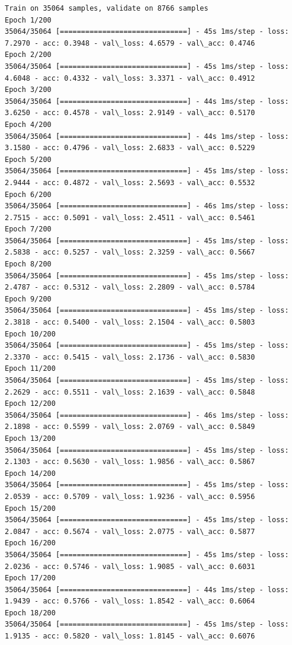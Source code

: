 \documentclass[11pt]{article}
\begin{document}
    \begin{Verbatim}[commandchars=\\\{\}]
Train on 35064 samples, validate on 8766 samples
Epoch 1/200
35064/35064 [==============================] - 45s 1ms/step - loss: 7.2970 - acc: 0.3948 - val\_loss: 4.6579 - val\_acc: 0.4746
Epoch 2/200
35064/35064 [==============================] - 45s 1ms/step - loss: 4.6048 - acc: 0.4332 - val\_loss: 3.3371 - val\_acc: 0.4912
Epoch 3/200
35064/35064 [==============================] - 44s 1ms/step - loss: 3.6250 - acc: 0.4578 - val\_loss: 2.9149 - val\_acc: 0.5170
Epoch 4/200
35064/35064 [==============================] - 44s 1ms/step - loss: 3.1580 - acc: 0.4796 - val\_loss: 2.6833 - val\_acc: 0.5229
Epoch 5/200
35064/35064 [==============================] - 45s 1ms/step - loss: 2.9444 - acc: 0.4872 - val\_loss: 2.5693 - val\_acc: 0.5532
Epoch 6/200
35064/35064 [==============================] - 46s 1ms/step - loss: 2.7515 - acc: 0.5091 - val\_loss: 2.4511 - val\_acc: 0.5461
Epoch 7/200
35064/35064 [==============================] - 45s 1ms/step - loss: 2.5838 - acc: 0.5257 - val\_loss: 2.3259 - val\_acc: 0.5667
Epoch 8/200
35064/35064 [==============================] - 45s 1ms/step - loss: 2.4787 - acc: 0.5312 - val\_loss: 2.2809 - val\_acc: 0.5784
Epoch 9/200
35064/35064 [==============================] - 45s 1ms/step - loss: 2.3818 - acc: 0.5400 - val\_loss: 2.1504 - val\_acc: 0.5803
Epoch 10/200
35064/35064 [==============================] - 45s 1ms/step - loss: 2.3370 - acc: 0.5415 - val\_loss: 2.1736 - val\_acc: 0.5830
Epoch 11/200
35064/35064 [==============================] - 45s 1ms/step - loss: 2.2629 - acc: 0.5511 - val\_loss: 2.1639 - val\_acc: 0.5848
Epoch 12/200
35064/35064 [==============================] - 46s 1ms/step - loss: 2.1898 - acc: 0.5599 - val\_loss: 2.0769 - val\_acc: 0.5849
Epoch 13/200
35064/35064 [==============================] - 45s 1ms/step - loss: 2.1303 - acc: 0.5630 - val\_loss: 1.9856 - val\_acc: 0.5867
Epoch 14/200
35064/35064 [==============================] - 45s 1ms/step - loss: 2.0539 - acc: 0.5709 - val\_loss: 1.9236 - val\_acc: 0.5956
Epoch 15/200
35064/35064 [==============================] - 45s 1ms/step - loss: 2.0847 - acc: 0.5674 - val\_loss: 2.0775 - val\_acc: 0.5877
Epoch 16/200
35064/35064 [==============================] - 45s 1ms/step - loss: 2.0236 - acc: 0.5746 - val\_loss: 1.9085 - val\_acc: 0.6031
Epoch 17/200
35064/35064 [==============================] - 44s 1ms/step - loss: 1.9439 - acc: 0.5766 - val\_loss: 1.8542 - val\_acc: 0.6064
Epoch 18/200
35064/35064 [==============================] - 45s 1ms/step - loss: 1.9135 - acc: 0.5820 - val\_loss: 1.8145 - val\_acc: 0.6076

\end{Verbatim}
\end{document}
